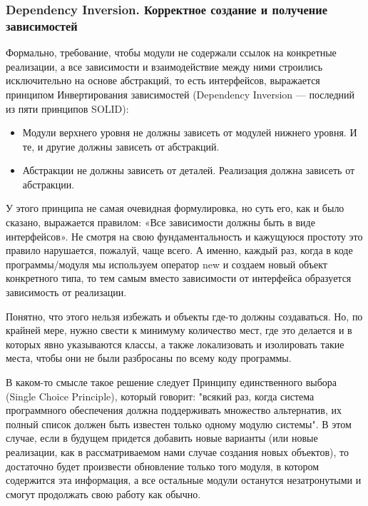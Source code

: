\documentclass[a4paper]{article}
\begin{document}
\begin{figure}[h]
\end{figure}

\subsubsection{Dependency Inversion. Корректное создание и получение зависимостей}

Формально, требование, чтобы модули не содержали ссылок на конкретные реализации, а все зависимости и взаимодействие между ними строились исключительно на основе абстракций, то есть интерфейсов, выражается принципом Инвертирования зависимостей (Dependency Inversion — последний из пяти принципов SOLID):
\begin{itemize}
\item Модули верхнего уровня не должны зависеть от модулей нижнего уровня. И те, и другие должны зависеть от абстракций.
\item Абстракции не должны зависеть от деталей. Реализация должна зависеть от абстракции.
\end{itemize}

У этого принципа не самая очевидная формулировка, но суть его, как и было сказано, выражается правилом: «Все зависимости должны быть в виде интерфейсов».
Не смотря на свою фундаментальность и кажущуюся простоту это правило нарушается, пожалуй, чаще всего. А именно, каждый раз, когда в коде программы/модуля мы используем оператор new и создаем новый объект конкретного типа, то тем самым вместо зависимости от интерфейса образуется зависимость от реализации.

Понятно, что этого нельзя избежать и объекты где-то должны создаваться. Но, по крайней мере, нужно свести к минимуму количество мест, где это делается и в которых явно указываются классы, а также локализовать и изолировать такие места, чтобы они не были разбросаны по всему коду программы.

В каком-то смысле такое решение следует Принципу единственного выбора (Single Choice Principle), который говорит: "всякий раз, когда система программного обеспечения должна поддерживать множество альтернатив, их полный список должен быть известен только одному модулю системы". В этом случае, если в будущем придется добавить новые варианты (или новые реализации, как в рассматриваемом нами случае создания новых объектов), то достаточно будет произвести обновление только того модуля, в котором содержится эта информация, а все остальные модули останутся незатронутыми и смогут продолжать свою работу как обычно.
\end{document}
